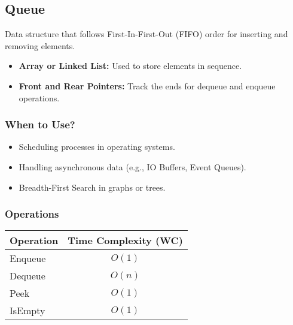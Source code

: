\subsection{Queue}
\begin{summary}
    Data structure that follows First-In-First-Out (FIFO) order for inserting and removing elements.
    \begin{itemize}
        \item \textbf{Array or Linked List:} Used to store elements in sequence.
        \item \textbf{Front and Rear Pointers:} Track the ends for dequeue and enqueue operations.
    \end{itemize}    
\end{summary}

\subsubsection{When to Use?}
\begin{summary}
    \begin{itemize}
        \item Scheduling processes in operating systems.
        \item Handling asynchronous data (e.g., IO Buffers, Event Queues).
        \item Breadth-First Search in graphs or trees.
    \end{itemize}
\end{summary}

\subsubsection{Operations}
\begin{summary}
    \begin{center}
        \begin{tabular}{lc}
            \toprule
            \textbf{Operation} & \textbf{Time Complexity (WC)} \\
            \midrule
            Enqueue  & $O(1)$ \\
            Dequeue  & $O(n)$ \\
            Peek     & $O(1)$ \\
            IsEmpty  & $O(1)$ \\
            \bottomrule
        \end{tabular}
    \end{center}
\end{summary}

